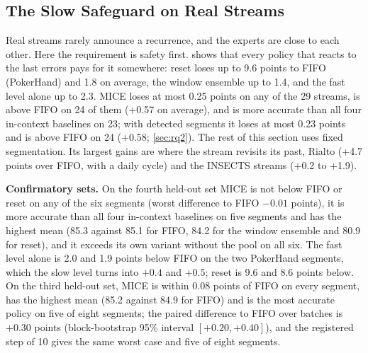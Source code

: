 \documentclass[11pt]{article}
\theoremstyle{plain}
\theoremstyle{definition}
\theoremstyle{remark}
\newcommand{\method}{\textsc{MICE}}   %
\begin{document}
\begin{table}[t]
  \centering
  \caption{Detected against fixed segmentation on every stream group with both (points): \method{} with detected
  segments (Det.) and with fixed segments (Fixed) minus the reference policy, their difference with a 95\%
  moving-block bootstrap interval of the group mean and the number of streams where it is positive, and Det.\ minus
  the archive with the same detected segments.}
  \label{tab:segsum}
  \small
  \setlength{\tabcolsep}{2pt}
\end{table}

\subsection{The Slow Safeguard on Real Streams}
\label{sec:rq3}


Real streams rarely announce a recurrence, and the experts are close to each other. Here the requirement is
safety first.  shows that every policy that reacts to the last errors pays for it somewhere: reset
loses up to 9.6 points to FIFO (PokerHand) and 1.8 on average, the window ensemble up to 1.4, and the fast level
alone up to 2.3. \method{} loses at most 0.25 points on any of the 29 streams, is above FIFO on 24 of them (+0.57 on
average), and is more accurate than all four in-context baselines on 23; with detected segments it loses at most
0.23 points and is above FIFO on 24 ($+0.58$; \cref{sec:rq2}). The rest of this section uses fixed segmentation. Its largest gains are where the stream
revisits its past, Rialto (+4.7 points over FIFO, with a daily cycle) and the INSECTS streams (+0.2 to +1.9).

\textbf{Confirmatory sets.} On the fourth held-out set \method{} is not below
FIFO or reset on any of the six segments (worst difference to FIFO $-0.01$ points), it is more accurate than all four
in-context baselines on five segments and has the highest mean (85.3 against 85.1 for FIFO, 84.2 for the window
ensemble and 80.9 for reset), and it exceeds its own variant without the pool on all six. The fast level alone is
2.0 and 1.9 points below FIFO on the two PokerHand segments, which the slow level turns into $+0.4$ and $+0.5$;
reset is 9.6 and 8.6 points below. On the third held-out set, \method{} is within 0.08 points of FIFO on every
segment, has the highest mean (85.2 against 84.9 for FIFO) and is the most accurate policy on five of eight
segments; the paired difference to FIFO over batches is $+0.30$ points (block-bootstrap 95\% interval
$[+0.20,+0.40]$), and the registered step of 10 gives the same worst case and five of eight segments.
\end{document}
